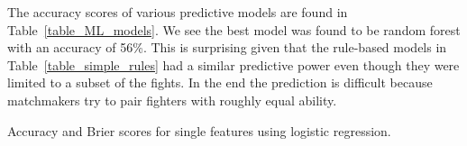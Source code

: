 The accuracy scores of various predictive models are found in Table~\ref{table_ML_models}.
We see the best model was found to be random forest with an accuracy of 56\%. This is
surprising given that the rule-based models in Table~\ref{table_simple_rules} had a
similar predictive power even though they were limited to a subset of the fights.
In the end the prediction is difficult because matchmakers try to pair fighters with
roughly equal ability.

\begin{center}
\begin{table}[h]

\caption{Accuracy and Brier scores for single features using logistic regression.}
\end{table}
\end{center}
